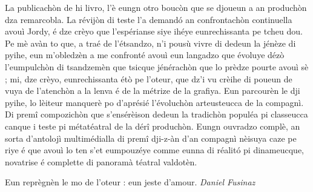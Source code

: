 La publicachòn de hi livro, l’è eungn otro boucòn que se djoueun a an produchòn dza remarcobla. La révijòn di teste l’a demandó an confrontachòn continuella avouì Jordy, é dze crèyo que l’espérianse siye ihéye eunrechissanta pe tcheu dou. Pe mè avàn to que, a traé de l’étsandzo, n’i pousù vivre di dedeun la jénèze di pyihe, eun m’obledzèn a me confronté avouì eun langadzo que évoluye dézò l’eumpulchòn di tsandzemèn que tsicque jénérachòn que lo prèdze pourte avouì sè ; mi, dze crèyo, eunrechissanta étò pe l’oteur, que dz’i vu crèihe di poueun de vuya de l’atenchòn a la lenva é de la métrize de la grafiya.
Eun parcourèn le dji pyihe, lo lèiteur manquerè po d’aprésié l’évoluchòn arteusteucca de la compagnì. Di premî compozichòn que s’ensérèison dedeun la tradichòn populéa pi classeucca canque i teste pi métatéatral de la dérî produchòn.
Eungn ouvradzo complè, an sorta d’antolojì multimédialla di premî dji-z-àn d’an compagnì nèisuya caze pe riye é que avouì lo ten s’et eumpouzéye comme eunna di réalitó pi dinameucque, novatrise é complette di panoramà téatral valdotèn. 

Eun reprègnèn le mo de l’oteur : eun jeste d’amour.
\newline
\newline
\hspace*{\fill} \textit{Daniel Fusinaz}

